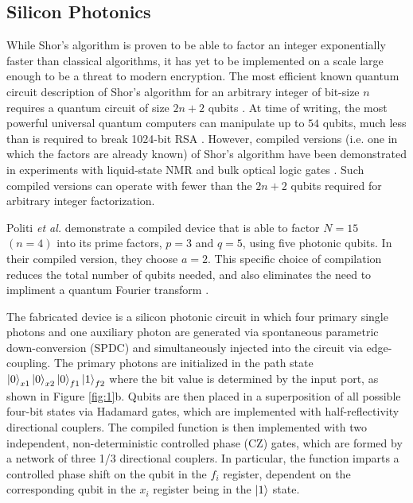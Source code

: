 \documentclass[letterpaper, 10 pt, conference]{ieeeconf}  %
\begin{document}
\subsection{Silicon Photonics}

While Shor's algorithm is proven to be able to factor an integer exponentially faster than classical algorithms, it has yet to be implemented on a scale large enough to be a threat to modern encryption. The most efficient known quantum circuit description of Shor's algorithm for an arbitrary integer of bit-size $n$ requires a quantum circuit of size $2n + 2$ qubits \cite{shorssmall}. At time of writing, the most powerful universal quantum computers can manipulate up to $54$ qubits, much less than is required to break 1024-bit RSA \cite{googlequbit}. However, compiled versions (i.e. one in which the factors are already known) of Shor's algorithm have been demonstrated in experiments with liquid-state NMR and bulk optical logic gates \cite{logicgate}. Such compiled versions can operate with fewer than the $2n+2$ qubits required for arbitrary integer factorization. 

Politi \textit{et al.} demonstrate a compiled device that is able to factor $N = 15$ $(n=4)$ into its prime factors, $p=3$ and $q=5$, using five photonic qubits. In their compiled version, they choose $a = 2$. This specific choice of compilation reduces the total number of qubits needed, and also eliminates the need to impliment a quantum Fourier transform \cite{Shorphotonics}. 

The fabricated device is a silicon photonic circuit in which four primary single photons and one auxiliary photon are generated via spontaneous parametric down-conversion (SPDC) and simultaneously injected into the circuit via edge-coupling. The primary photons are initialized in the path state $\ket{0}_{x1}\ket{0}_{x2}\ket{0}_{f1}\ket{1}_{f2}$ where the bit value is determined by the input port, as shown in Figure \ref{fig:1}b. Qubits are then placed in a superposition of all possible four-bit states via Hadamard gates, which are implemented with half-reflectivity directional couplers. The compiled function is then implemented with two independent, non-deterministic controlled phase (CZ) gates, which are formed by a network of three 1/3 directional couplers. In particular, the function imparts a controlled phase shift on the qubit in the $f_i$ register, dependent on the corresponding qubit in the $x_i$ register being in the $\ket{1}$ state. 
\end{document}
